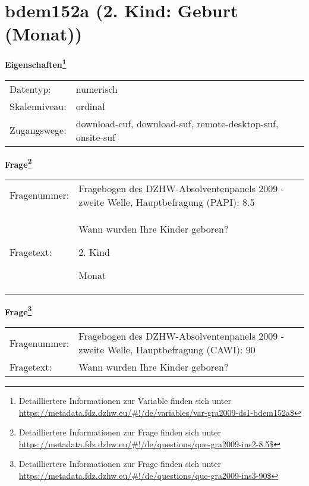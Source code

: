 
    \setcounter{footnote}{0}

    \vspace*{-1.8cm}
	\section{bdem152a (2. Kind: Geburt (Monat))}
	\label{section:bdem152a}



    \vspace*{0.5cm}
    \noindent\textbf{Eigenschaften\footnote{Detailliertere Informationen zur Variable finden sich unter
		\url{https://metadata.fdz.dzhw.eu/\#!/de/variables/var-gra2009-ds1-bdem152a$}}}\\
	\begin{tabularx}{\hsize}{@{}lX}
	Datentyp: & numerisch \\
	Skalenniveau: & ordinal \\
	Zugangswege: &
	  download-cuf, 
	  download-suf, 
	  remote-desktop-suf, 
	  onsite-suf
 \\
    \end{tabularx}



				\vspace*{0.5cm}
                \noindent\textbf{Frage\footnote{Detailliertere Informationen zur Frage finden sich unter
		              \url{https://metadata.fdz.dzhw.eu/\#!/de/questions/que-gra2009-ins2-8.5$}}}\\
				\begin{tabularx}{\hsize}{@{}lX}
					Fragenummer: &
					  Fragebogen des DZHW-Absolventenpanels 2009 - zweite Welle, Hauptbefragung (PAPI):
					  8.5
 \\
					Fragetext: & Wann wurden Ihre Kinder geboren?\par  2. Kind\par  Monat \\
				\end{tabularx}
				\vspace*{0.5cm}
                \noindent\textbf{Frage\footnote{Detailliertere Informationen zur Frage finden sich unter
		              \url{https://metadata.fdz.dzhw.eu/\#!/de/questions/que-gra2009-ins3-90$}}}\\
				\begin{tabularx}{\hsize}{@{}lX}
					Fragenummer: &
					  Fragebogen des DZHW-Absolventenpanels 2009 - zweite Welle, Hauptbefragung (CAWI):
					  90
 \\
					Fragetext: & Wann wurden Ihre Kinder geboren? \\
				\end{tabularx}





